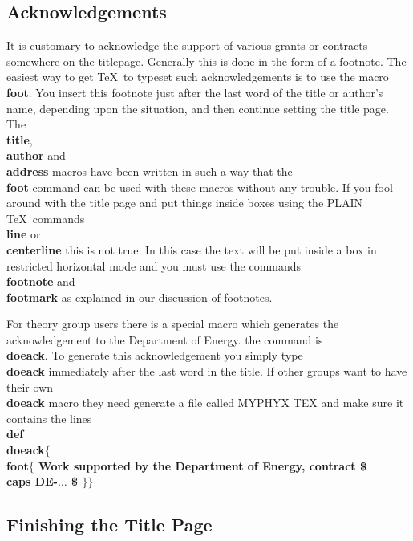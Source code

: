 \subsection{Acknowledgements}
 
It is customary to acknowledge the support of various grants or
contracts somewhere on the titlepage.
Generally this is done in the form of a footnote.
The easiest way to get \TeX\ to typeset such acknowledgements is to
use the macro {\bf \\foot}.
You insert this footnote just after the last word of the title
or author's name, depending upon the situation, and then continue
setting the title page.
The {\bf \\title}, {\bf \\author} and {\bf \\address} macros
have been written in such a way that the {\bf \\foot} command
can be used with these macros without any trouble.
If you fool around with the title page and put things inside boxes
using the PLAIN \TeX\ commands {\bf \\line} or {\bf \\centerline}
this is not true.
In this case the text will be put inside a box in restricted
horizontal mode and you must use the commands {\bf \\footnote}
and {\bf \\footmark} as explained in our discussion of footnotes.
 
For theory group users there is a special macro which generates
the acknowledgement to the Department of Energy.
the command is {\bf \\doeack}.
To generate this acknowledgement you simply type
{\bf \\doeack} immediately after the last word in the title.
If other groups want to have their own {\bf \\doeack} macro
they need generate a file called MYPHYX TEX
and make sure it contains the lines  \nextline
{\bf \\def\\doeack$\{$\\foot$\{$ \rm Work supported by the Department of
Energy, contract \bf \$\\caps \rm DE-$\ldots$ \bf \$ $\}\}$ }
 
\subsection{Finishing the Title Page}
 
